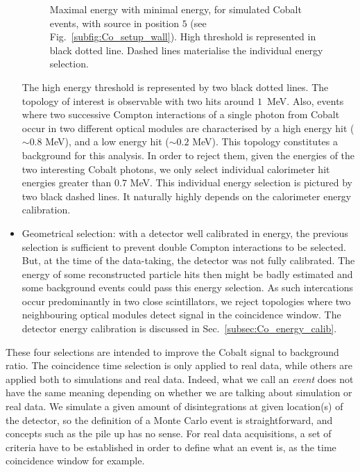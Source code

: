 \begin{itemize}
\begin{figure}[h]
    \caption{Maximal energy with minimal energy, for simulated Cobalt events, with source in position $5$ (see Fig.~\ref{subfig:Co_setup_wall}).
      High threshold is represented in black dotted line.
      Dashed lines materialise the individual energy selection.
      \label{fig:Co_energy_cut}}
  \end{figure}
  The high energy threshold is represented by two black dotted lines.
  The topology of interest is observable with two hits around $1$~MeV.
  Also, events where two successive Compton interactions of a single photon from Cobalt occur in two different optical modules are characterised by a high energy hit ($\sim 0.8$ MeV), and a low energy hit ($\sim 0.2$ MeV).
  This topology constitutes a background for this analysis.
  In order to reject them, given the energies of the two interesting Cobalt photons, we only select individual calorimeter hit energies greater than $0.7$ MeV.
  This individual energy selection is pictured by two black dashed lines.
  It naturally highly depends on the calorimeter energy calibration.
\item Geometrical selection:
  with a detector well calibrated in energy, the previous selection is sufficient to prevent double Compton interactions to be selected.
  But, at the time of the data-taking, the detector was not fully calibrated.
  The energy of some reconstructed particle hits then might be badly estimated and some background events could pass this energy selection.
  As such intercations occur predominantly in two close scintillators, we reject topologies where two neighbouring optical modules detect signal in the coincidence window.
  The detector energy calibration is discussed in Sec.~\ref{subsec:Co_energy_calib}.
\end{itemize}
These four selections are intended to improve the Cobalt signal to background ratio.
The coincidence time selection is only applied to real data, while others are applied both to simulations and real data.
Indeed, what we call an \emph{event} does not have the same meaning depending on whether we are talking about simulation or real data.
We simulate a given amount of disintegrations at given location(s) of the detector, so the definition of a Monte Carlo event is straightforward, and concepts such as the pile up has no sense.
For real data acquisitions, a set of criteria have to be established in order to define what an event is, as the time coincidence window for example.

